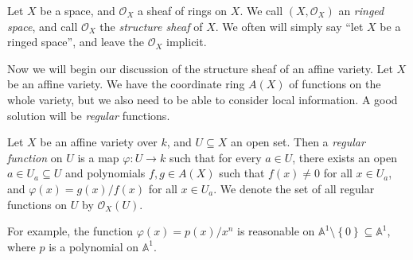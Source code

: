 \begin{definition}\label{dfn:3-2}
	Let $X$ be a space, and $\mathcal{O}_X$ a sheaf of rings on $X$. We call $(X,\mathcal{O} _X)$ an \emph{ringed space}, and call $\mathcal{O} _X$ the \emph{structure sheaf} of $X$. We often will simply say ``let $X$ be a ringed space'', and leave the $\mathcal{O} _X$ implicit.
\end{definition}

Now we will begin our discussion of the structure sheaf of an affine variety. Let $X$ be an affine variety. We have the coordinate ring $A(X)$ of functions on the whole variety, but we also need to be able to consider local information. A good solution will be \emph{regular} functions.

\begin{definition}\label{dfn:3-3}
	Let $X$ be an affine variety over $k$, and $U\subseteq X$ an open set. Then a \emph{regular function} on $U$ is a map $\varphi : U \to k$ such that for every $a\in U$, there exists an open $a\in U_a \subseteq U$ and polynomials $f,g\in A(X)$ such that $f(x) \neq 0$ for all $x\in U_a$, and $\varphi (x) = g(x) / f(x)$ for all $x\in U_a$. We denote the set of all regular functions on $U$ by $\mathcal{O} _X(U)$.
\end{definition}

For example, the function $\varphi (x) = p(x) / x^n$ is reasonable on $\mathbb{A}^1\setminus \left\{ 0 \right\} \subseteq \mathbb{A} ^1$, where $p$ is a polynomial on $\mathbb{A} ^1$.
